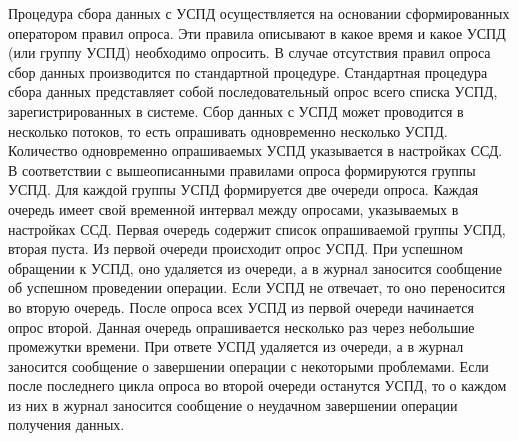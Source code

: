 Процедура сбора данных с УСПД осуществляется на основании сформированных оператором правил опроса. Эти правила описывают в какое время и какое УСПД (или группу УСПД) необходимо опросить. В случае отсутствия правил опроса сбор данных производится по стандартной процедуре. Стандартная процедура сбора данных представляет собой последовательный опрос всего списка УСПД, зарегистрированных в системе. Сбор данных с УСПД может проводится в несколько потоков, то есть опрашивать одновременно несколько УСПД. Количество одновременно опрашиваемых УСПД указывается в настройках ССД.
В соответствии с вышеописанными правилами опроса формируются группы УСПД. Для каждой группы УСПД формируется две очереди опроса. Каждая очередь имеет свой временной интервал между опросами, указываемых в настройках ССД. Первая очередь содержит список опрашиваемой группы УСПД, вторая пуста. Из первой очереди происходит опрос УСПД. При успешном обращении к УСПД, оно удаляется из очереди, а в журнал заносится сообщение об успешном проведении операции. Если УСПД не отвечает, то оно переносится во вторую очередь. После опроса всех УСПД из первой очереди начинается опрос второй.
Данная очередь опрашивается несколько раз через небольшие промежутки времени. При ответе УСПД удаляется из очереди, а в журнал заносится сообщение о завершении операции с некоторыми проблемами. Если после последнего цикла опроса во второй очереди останутся УСПД, то о каждом из них в журнал заносится сообщение о неудачном завершении операции получения данных.